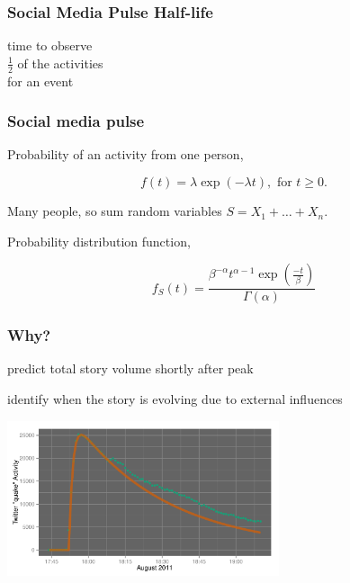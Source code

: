 \documentclass{beamer}
\begin{document}

\begin{frame}\frametitle{Social Media Pulse Half-life}
\begin{center}
{\Huge time to observe \\[6pt] $\frac{1}{2}$ of the activities \\[6pt] for an event}
\end{center}
\end{frame}

\begin{frame}
\frametitle{Social media pulse} 
Probability of an activity from one person,

\begin{equation*}
f(t) = \lambda \exp(-\lambda t), \text{ for } t \geq 0.
\end{equation*}

Many people, so sum random variables $S = X_1 + \ldots + X_{n}$.

Probability distribution function,

\begin{equation*}
f_S(t) = \frac{ \beta^{-\alpha} t^{\alpha-1} \exp( \frac{-t}{\beta}) } {\Gamma(\alpha)}
\end{equation*}

%
\end{frame}

\begin{frame}\frametitle{Why?}
\begin{itemize}
\Large{
\item predict total story volume shortly after peak
\item identify when the story is evolving due to external influences
}
\end{itemize}
\end{frame}


\begin{frame}
  \begin{center}
    \includegraphics[width=8cm]{./imgs/va_quake_fit1.pdf}
  \end{center}
\end{frame}
\end{document}
